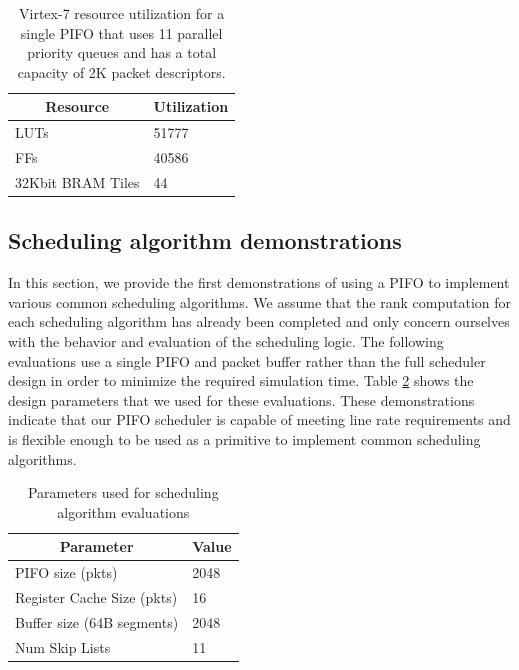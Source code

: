 \begin{table}[tbp]
\centering
\caption{Virtex-7 resource utilization for a single PIFO that uses 11 parallel priority queues and has a total capacity of 2K packet descriptors.}
\label{tab:utilization}
\begin{tabular}{|l|l|}
\hline
\multicolumn{1}{|c|}{\textbf{Resource}} & \multicolumn{1}{c|}{\textbf{Utilization}} \\ \hline
LUTs                                    &  51777                                         \\ \hline
FFs                                     &  40586                                         \\ \hline
32Kbit BRAM Tiles                       &  44                                         \\ \hline
\end{tabular}
\end{table}

\subsection{Scheduling algorithm demonstrations}\label{sec:sched-evals}

In this section, we provide the first demonstrations of using a PIFO to implement various common scheduling algorithms. We assume that the rank computation for each scheduling algorithm has already been completed and only concern ourselves with the behavior and evaluation of the scheduling logic. The following evaluations use a single PIFO and packet buffer rather than the full scheduler design in order to minimize the required simulation time. Table \ref{tab:params} shows the design parameters that we used for these evaluations. These demonstrations indicate that our PIFO scheduler is capable of meeting line rate requirements and is flexible enough to be used as a primitive to implement common scheduling algorithms.

\begin{table}[tbp]
\centering
\caption{Parameters used for scheduling algorithm evaluations}
\label{tab:params}
\begin{tabular}{|l|l|}
\hline
\multicolumn{1}{|c|}{\textbf{Parameter}} & \multicolumn{1}{c|}{\textbf{Value}} \\ \hline
PIFO size (pkts)                         & 2048                                \\ \hline
Register Cache Size (pkts)               & 16                                  \\ \hline
Buffer size (64B segments)               & 2048                                \\ \hline
Num Skip Lists                           & 11                                  \\ \hline
\end{tabular}
\end{table}

